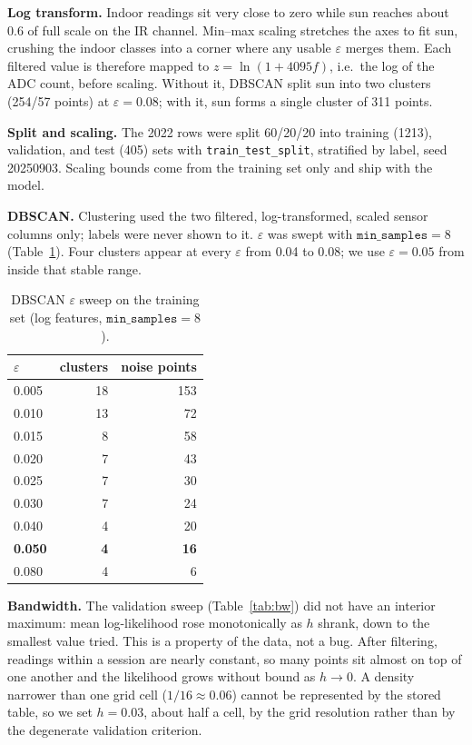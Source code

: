 \documentclass[10pt,a4paper,twocolumn]{article}
\begin{document}
\textbf{Log transform.} Indoor readings sit very close to zero while sun reaches about
0.6 of full scale on the IR channel. Min--max scaling stretches the axes to fit sun,
crushing the indoor classes into a corner where any usable $\varepsilon$ merges them.
Each filtered value is therefore mapped to $z=\ln(1+4095f)$, i.e.\ the log of the ADC
count, before scaling. Without it, DBSCAN split sun into two clusters (254/57 points) at
$\varepsilon=0.08$; with it, sun forms a single cluster of 311 points.

\textbf{Split and scaling.} The 2022 rows were split 60/20/20 into training (1213),
validation, and test (405) sets with \texttt{train\_test\_split}, stratified by label,
seed 20250903. Scaling bounds come from the training set only and ship with the model.

\textbf{DBSCAN.} Clustering used the two filtered, log-transformed, scaled sensor columns
only; labels were never shown to it. $\varepsilon$ was swept with $\texttt{min\_samples}=8$
(Table~\ref{tab:eps}). Four clusters appear at every $\varepsilon$ from 0.04 to 0.08;
we use $\varepsilon=0.05$ from inside that stable range.

\begin{table}[!bt]
\centering
\caption{DBSCAN $\varepsilon$ sweep on the training set (log features, $\texttt{min\_samples}=8$).}
\label{tab:eps}
\begin{tabularx}{\linewidth}{@{}X r r@{}}
\toprule
$\varepsilon$ & clusters & noise points \\
\midrule
0.005 & 18 & 153 \\
0.010 & 13 & 72 \\
0.015 & 8 & 58 \\
0.020 & 7 & 43 \\
0.025 & 7 & 30 \\
0.030 & 7 & 24 \\
0.040 & 4 & 20 \\
\textbf{0.050} & \textbf{4} & \textbf{16} \\
0.080 & 4 & 6 \\
\bottomrule
\end{tabularx}
\end{table}

\textbf{Bandwidth.} The validation sweep (Table~\ref{tab:bw}) did not have an interior
maximum: mean log-likelihood rose monotonically as $h$ shrank, down to the smallest value
tried. This is a property of the data, not a bug. After filtering, readings within a
session are nearly constant, so many points sit almost on top of one another and the
likelihood grows without bound as $h\to0$. A density narrower than one grid cell
($1/16\approx0.06$) cannot be represented by the stored table, so we set $h=0.03$, about
half a cell, by the grid resolution rather than by the degenerate validation criterion.
\end{document}
